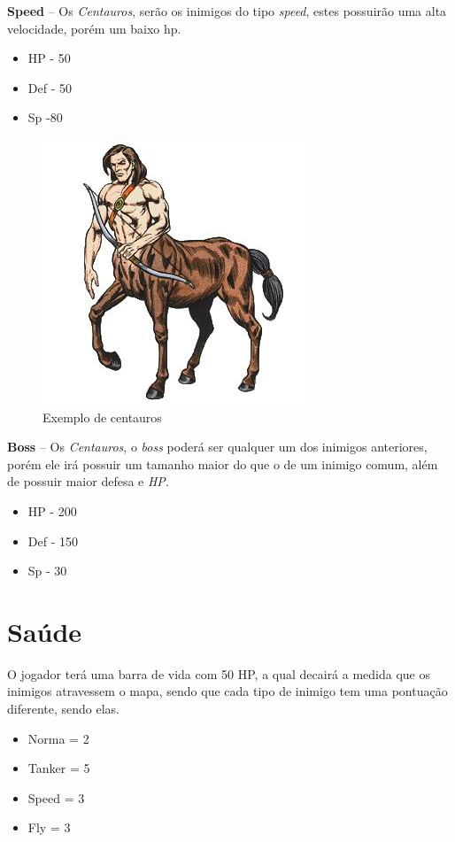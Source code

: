\documentclass[11pt]{article} %
\begin{document}
\textbf{{\large Speed}} – Os \textit{Centauros}, serão os inimigos do tipo \textit{speed}, estes possuirão uma alta velocidade, porém um baixo hp.
\begin{itemize}
\item HP - 50
\item Def - 50
\item Sp -80
\end{itemize}

\begin{figure}[!htp]
\centering
\includegraphics[scale=0.6]{res/characters/centauro.jpg}
\caption{Exemplo de centauros}
\label{cyclops}
\end{figure}

\textbf{{\large Boss}} – Os \textit{Centauros}, o \textit{boss} poderá ser qualquer um dos inimigos anteriores, porém ele irá possuir um tamanho maior do que o de um inimigo comum, além de possuir maior defesa e \textit{HP}.
\begin{itemize}
\item HP - 200
\item Def - 150
\item Sp - 30
\end{itemize}

\newpage

\section{Saúde}

O jogador terá uma barra de vida com 50 HP, a qual decairá a medida que os inimigos atravessem o mapa, sendo que cada tipo de inimigo tem uma pontuação diferente, sendo elas.
\begin{itemize}
 \item Norma = 2 
 \item Tanker = 5
 \item Speed = 3
 \item Fly = 3
 \end{itemize} 
\end{document}

